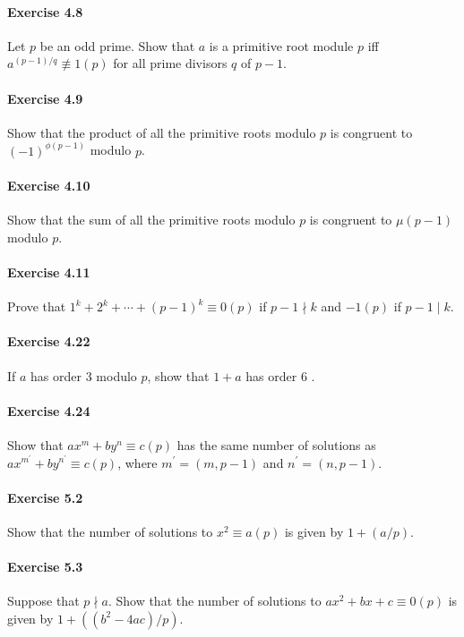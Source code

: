 \documentclass{article}
\begin{document}
\paragraph{Exercise 4.8} Let $p$ be an odd prime. Show that $a$ is a primitive root module $p$ iff $a^{(p-1) / q} \not \equiv 1(p)$ for all prime divisors $q$ of $p-1$.

\paragraph{Exercise 4.9} Show that the product of all the primitive roots modulo $p$ is congruent to $(-1)^{\phi(p-1)}$ modulo $p$.

\paragraph{Exercise 4.10} Show that the sum of all the primitive roots modulo $p$ is congruent to $\mu(p-1)$ modulo $p$.

\paragraph{Exercise 4.11} Prove that $1^{k}+2^{k}+\cdots+(p-1)^{k} \equiv 0(p)$ if $p-1 \nmid k$ and $-1(p)$ if $p-1 \mid k$.

\paragraph{Exercise 4.22} If $a$ has order 3 modulo $p$, show that $1+a$ has order 6 .

\paragraph{Exercise 4.24} Show that $a x^{m}+b y^{n} \equiv c(p)$ has the same number of solutions as $a x^{m^{\prime}}+b y^{n^{\prime}} \equiv c(p)$, where $m^{\prime}=(m, p-1)$ and $n^{\prime}=(n, p-1)$.

\paragraph{Exercise 5.2} Show that the number of solutions to $x^{2} \equiv a(p)$ is given by $1+(a / p)$.

\paragraph{Exercise 5.3} Suppose that $p \nmid a$. Show that the number of solutions to $a x^{2}+b x+c \equiv 0(p)$ is given by $1+\left(\left(b^{2}-4 a c\right) / p\right)$.
\end{document}
